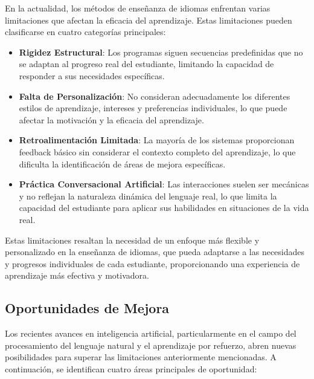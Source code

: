 En la actualidad, los métodos de enseñanza de idiomas enfrentan varias limitaciones que afectan la eficacia del aprendizaje. Estas limitaciones pueden clasificarse en cuatro categorías principales:

\begin{itemize}
  \item \textbf{Rigidez Estructural}: Los programas siguen secuencias predefinidas que no se adaptan al progreso real del estudiante, limitando la capacidad de responder a sus necesidades específicas.
  \item \textbf{Falta de Personalización}: No consideran adecuadamente los diferentes estilos de aprendizaje, intereses y preferencias individuales, lo que puede afectar la motivación y la eficacia del aprendizaje.
  \item \textbf{Retroalimentación Limitada}: La mayoría de los sistemas proporcionan feedback básico sin considerar el contexto completo del aprendizaje, lo que dificulta la identificación de áreas de mejora específicas.
  \item \textbf{Práctica Conversacional Artificial}: Las interacciones suelen ser mecánicas y no reflejan la naturaleza dinámica del lenguaje real, lo que limita la capacidad del estudiante para aplicar sus habilidades en situaciones de la vida real.
\end{itemize}

Estas limitaciones resaltan la necesidad de un enfoque más flexible y personalizado en la enseñanza de idiomas, que pueda adaptarse a las necesidades y progresos individuales de cada estudiante, proporcionando una experiencia de aprendizaje más efectiva y motivadora.

\subsection{Oportunidades de Mejora}
\label{subsec:oportunidades-de-mejora}

Los recientes avances en inteligencia artificial, particularmente en el campo del procesamiento del lenguaje natural y el aprendizaje por refuerzo, abren nuevas posibilidades para superar las limitaciones anteriormente mencionadas. A continuación, se identifican cuatro áreas principales de oportunidad:


